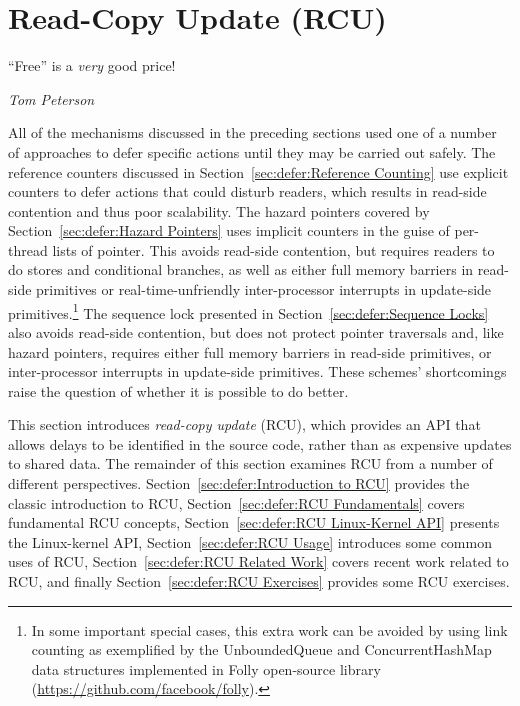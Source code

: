 
\section{Read-Copy Update (RCU)}
\label{sec:defer:Read-Copy Update (RCU)}
%
\epigraph{``Free'' is a \emph{very} good price!}{\emph{Tom Peterson}}

%
All of the mechanisms discussed in the preceding sections
used one of a number of approaches to defer specific actions
until they may be carried out safely.
The reference counters discussed in
Section~\ref{sec:defer:Reference Counting}
use explicit counters to defer actions that could disturb readers,
which results in read-side contention and thus poor scalability.
The hazard pointers covered by
Section~\ref{sec:defer:Hazard Pointers}
uses implicit counters in the guise of per-thread lists of pointer.
This avoids read-side contention, but requires readers to do stores and
conditional branches, as well as either full memory barriers in read-side
primitives or real-time-unfriendly inter-processor interrupts in
update-side primitives.\footnote{
	In some important special cases, this extra work can be avoided
	by using link counting as exemplified by the UnboundedQueue
	and ConcurrentHashMap data structures implemented in Folly
	open-source library
	(\url{https://github.com/facebook/folly}).}
The sequence lock presented in
Section~\ref{sec:defer:Sequence Locks}
also avoids read-side contention, but does not protect pointer
traversals and, like hazard pointers, requires either full memory barriers
in read-side primitives, or inter-processor interrupts in update-side
primitives.
These schemes' shortcomings raise the question of
whether it is possible to do better.

This section introduces \emph{read-copy update} (RCU), which provides
an API that allows delays to be identified in the source code,
rather than as expensive updates to shared data.
The remainder of this
section examines RCU from a number of different perspectives.
Section~\ref{sec:defer:Introduction to RCU} provides the classic
introduction to RCU,
Section~\ref{sec:defer:RCU Fundamentals} covers fundamental RCU
concepts,
Section~\ref{sec:defer:RCU Linux-Kernel API} presents the Linux-kernel
API,
Section~\ref{sec:defer:RCU Usage} introduces some common uses of RCU,
Section~\ref{sec:defer:RCU Related Work} covers recent work related
to RCU,
and finally
Section~\ref{sec:defer:RCU Exercises} provides some RCU exercises.






